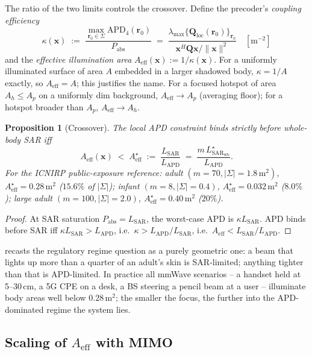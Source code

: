 \documentclass[journal]{IEEEtran}
\newtheorem{proposition}{Proposition}
\newcommand{\rr}{\bm{r}}
\newcommand{\xx}{\bm{x}}
\newcommand{\SARwb}{\mathrm{SAR}_{\mathrm{wb}}}
\newcommand{\SAR}{\mathrm{SAR}}
\newcommand{\APD}{\mathrm{APD}}
\newcommand{\Pabs}{P_{\mathrm{abs}}}
\newcommand{\Q}{\mathbf{Q}}
\newcommand{\Aeff}{A_{\mathrm{eff}}}
\begin{document}
The ratio of the two limits controls the crossover. Define the
precoder's \emph{coupling efficiency}
\begin{equation}\label{eq:kappa}
  \kappa(\xx) \;:=\; \frac{\max_{\rr_0\in\Sigma}\APD_4(\rr_0)}{\Pabs}
  \;=\; \frac{\lambda_{\max}\!\bigl\{\Q_{\mathrm{loc}}(\rr_0)\bigr\}_{\rr_0}}{\xx^H\Q\xx/\lVert\xx\rVert^2}
  \quad[\mathrm{m}^{-2}]
\end{equation}
and the \emph{effective illumination area}
$\Aeff(\xx):= 1/\kappa(\xx)$. For a uniformly illuminated
surface of area $A$ embedded in a larger shadowed body, $\kappa=1/A$
exactly, so $\Aeff=A$; this justifies the name. For a focused
hotspot of area $A_h\le A_p$ on a uniformly dim background,
$\Aeff\!\to\! A_p$ (averaging floor); for a hotspot broader than
$A_p$, $\Aeff\!\to\! A_h$.

\begin{proposition}[Crossover]\label{prop:cross}
The local APD constraint binds strictly before whole-body SAR iff
\begin{equation}\label{eq:crossover}
  \Aeff(\xx) \;<\; \Aeff^\star
  \;:=\; \frac{L_{\SAR}}{L_{\APD}}
  \;=\; \frac{m\,L_{\SARwb}^\star}{L_{\APD}}.
\end{equation}
For the ICNIRP public-exposure reference: adult
$(m\!=\!70,|\Sigma|\!=\!1.8\,\mathrm m^2)$, $\Aeff^\star\!=\!0.28\,\mathrm m^2$
($15.6\%$ of $|\Sigma|$); infant $(m\!=\!8,|\Sigma|\!=\!0.4)$,
$\Aeff^\star\!=\!0.032\,\mathrm m^2$ ($8.0\%$); large adult
$(m\!=\!100,|\Sigma|\!=\!2.0)$, $\Aeff^\star\!=\!0.40\,\mathrm m^2$
($20\%$).
\end{proposition}

\begin{proof}
At SAR saturation $\Pabs\!=\!L_{\SAR}$, the worst-case APD is
$\kappa L_{\SAR}$. APD binds before SAR iff
$\kappa L_{\SAR}\!>\!L_{\APD}$, i.e.\ $\kappa\!>\!L_{\APD}/L_{\SAR}$,
i.e.\ $\Aeff\!<\!L_{\SAR}/L_{\APD}$.
\end{proof}

 recasts the regulatory regime question as a purely
geometric one: a beam that lights up more than a quarter of an adult's
skin is SAR-limited; anything tighter than that is APD-limited.
In practice all mmWave scenarios -- a handset held at 5--30\,cm, a
5G CPE on a desk, a BS steering a pencil beam at a user -- illuminate
body areas well below $0.28\,\mathrm m^2$; the smaller the focus, the
further into the APD-dominated regime the system lies.

\subsection{Scaling of $\Aeff$ with MIMO}
\end{document}

